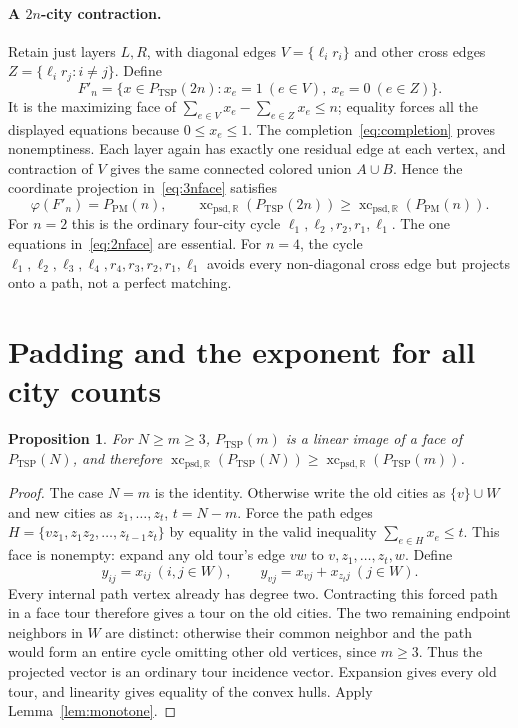 \documentclass[11pt]{article}
\newtheorem{proposition}[theorem]{Proposition}
\newcommand{\R}{\mathbb R}
\newcommand{\sxc}{\operatorname{xc}_{\mathrm{psd},\R}}
\newcommand{\PM}{P_{\mathrm{PM}}}
\newcommand{\TSP}{P_{\mathrm{TSP}}}
\begin{document}
\paragraph{A $2n$-city contraction.}
Retain just layers $L,R$, with diagonal edges $V=\{\ell_ir_i\}$ and other cross edges $Z=\{\ell_ir_j:i\ne j\}$. Define
\begin{equation}\label{eq:2nface}
 F'_n=\{x\in\TSP(2n):x_e=1\ (e\in V),\ x_e=0\ (e\in Z)\}.
\end{equation}
It is the maximizing face of $\sum_{e\in V}x_e-\sum_{e\in Z}x_e\le n$; equality forces all the displayed equations because $0\le x_e\le1$. The completion~\eqref{eq:completion} proves nonemptiness. Each layer again has exactly one residual edge at each vertex, and contraction of $V$ gives the same connected colored union $A\cup B$. Hence the coordinate projection in~\eqref{eq:3nface} satisfies
\begin{equation}\label{eq:2nreduction}
 \varphi(F'_n)=\PM(n),\qquad
 \sxc(\TSP(2n))\ge\sxc(\PM(n)).
\end{equation}
For $n=2$ this is the ordinary four-city cycle $\ell_1,\ell_2,r_2,r_1,\ell_1$. The one equations in~\eqref{eq:2nface} are essential. For $n=4$, the cycle $\ell_1,\ell_2,\ell_3,\ell_4,r_4,r_3,r_2,r_1,\ell_1$ avoids every non-diagonal cross edge but projects onto a path, not a perfect matching.

\section{Padding and the exponent for all city counts}
\begin{proposition}\label{prop:padding}
For $N\ge m\ge3$, $\TSP(m)$ is a linear image of a face of $\TSP(N)$, and therefore $\sxc(\TSP(N))\ge\sxc(\TSP(m))$.
\end{proposition}
\begin{proof}
The case $N=m$ is the identity. Otherwise write the old cities as $\{v\}\cup W$ and new cities as $z_1,\ldots,z_t$, $t=N-m$. Force the path edges $H=\{vz_1,z_1z_2,\ldots,z_{t-1}z_t\}$ by equality in the valid inequality $\sum_{e\in H}x_e\le t$. This face is nonempty: expand any old tour's edge $vw$ to $v,z_1,\ldots,z_t,w$. Define
\[
 y_{ij}=x_{ij}\ (i,j\in W),\qquad
 y_{vj}=x_{vj}+x_{z_tj}\ (j\in W).
\]
Every internal path vertex already has degree two. Contracting this forced path in a face tour therefore gives a tour on the old cities. The two remaining endpoint neighbors in $W$ are distinct: otherwise their common neighbor and the path would form an entire cycle omitting other old vertices, since $m\ge3$. Thus the projected vector is an ordinary tour incidence vector. Expansion gives every old tour, and linearity gives equality of the convex hulls. Apply Lemma~\ref{lem:monotone}.
\end{proof}
\end{document}
